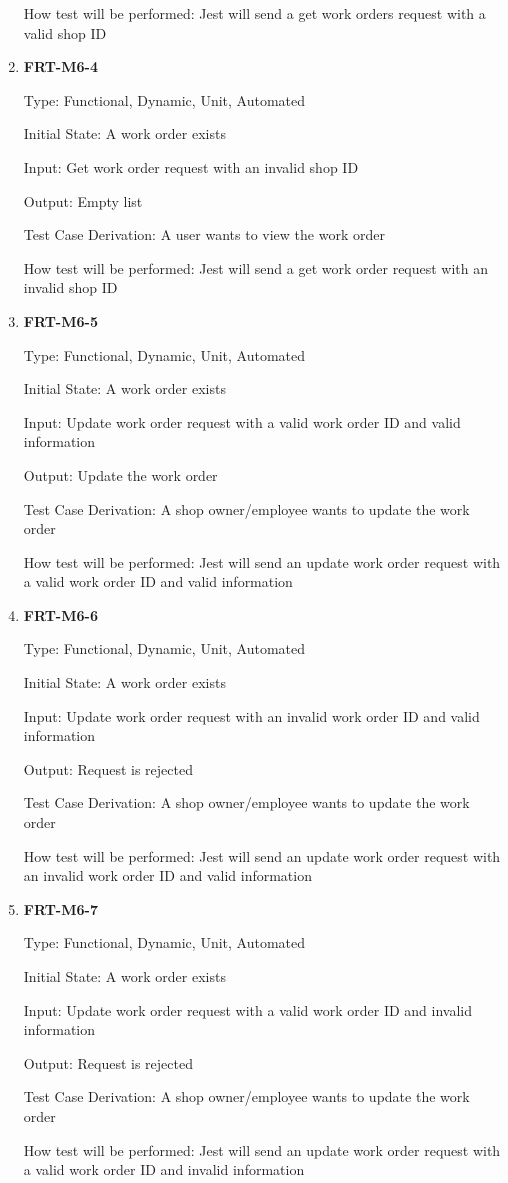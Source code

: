 \documentclass[12pt, titlepage]{article}
\begin{document}
\begin{enumerate}
	      How test will be performed: Jest will send a get work orders request with a valid shop ID

	\item \textbf{FRT-M6-4}

	      Type: Functional, Dynamic, Unit, Automated

	      Initial State: A work order exists

	      Input: Get work order request with an invalid shop ID

	      Output: Empty list

	      Test Case Derivation: A user wants to view the work order

	      How test will be performed: Jest will send a get work order request with an invalid shop ID

	\item \textbf{FRT-M6-5}

	      Type: Functional, Dynamic, Unit, Automated

	      Initial State: A work order exists

	      Input: Update work order request with a valid work order ID and valid information

	      Output: Update the work order

	      Test Case Derivation: A shop owner/employee wants to update the work order

	      How test will be performed: Jest will send an update work order request with a valid work order ID
	      and valid information

	\item \textbf{FRT-M6-6}

	      Type: Functional, Dynamic, Unit, Automated

	      Initial State: A work order exists

	      Input: Update work order request with an invalid work order ID and valid information

	      Output: Request is rejected

	      Test Case Derivation: A shop owner/employee wants to update the work order

	      How test will be performed: Jest will send an update work order request with an invalid work order
	      ID and valid information

	\item \textbf{FRT-M6-7}

	      Type: Functional, Dynamic, Unit, Automated

	      Initial State: A work order exists

	      Input: Update work order request with a valid work order ID and invalid information

	      Output: Request is rejected

	      Test Case Derivation: A shop owner/employee wants to update the work order

	      How test will be performed: Jest will send an update work order request with a valid work order ID
	      and invalid information

\end{enumerate}
\end{document}

